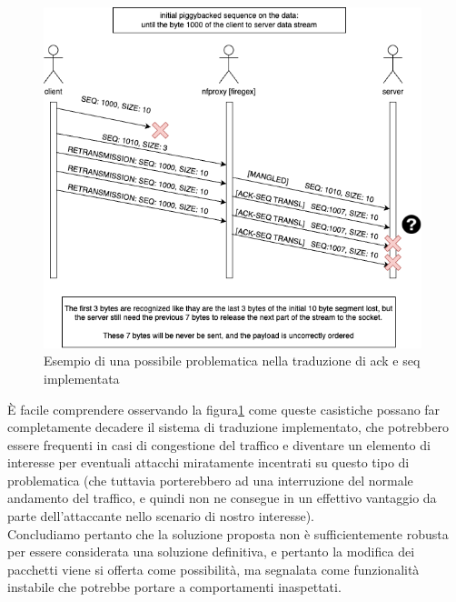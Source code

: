 \begin{figure}[H]
    \centering
    \includegraphics[width=0.98\textwidth]{images/chapter3/TCP_ack_seq_transl_failure.drawio.png}
    \caption{Esempio di una possibile problematica nella traduzione di ack e seq implementata}\label{fig:tcp_ack_seq_transl_failure}
\end{figure}

È facile comprendere osservando la figura\ref{fig:tcp_ack_seq_transl_failure} come queste casistiche possano far completamente
decadere il sistema di traduzione implementato, che potrebbero essere frequenti in casi di congestione del traffico e diventare
un elemento di interesse per eventuali attacchi miratamente incentrati su questo tipo di problematica (che tuttavia porterebbero ad una
interruzione del normale andamento del traffico, e quindi non ne consegue in un effettivo vantaggio da parte dell'attaccante nello scenario di nostro interesse).\\

Concludiamo pertanto che la soluzione proposta non è sufficientemente robusta per essere considerata una soluzione definitiva, e pertanto la modifica dei pacchetti viene si
offerta come possibilità, ma segnalata come funzionalità instabile che potrebbe portare a comportamenti inaspettati.\\

